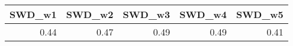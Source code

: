 
\begin{tabular}{r|r|r|r|r}
\hline
SWD\_w1 & SWD\_w2 & SWD\_w3 & SWD\_w4 & SWD\_w5\\
\hline
0.44 & 0.47 & 0.49 & 0.49 & 0.41\\
\hline
\end{tabular}
